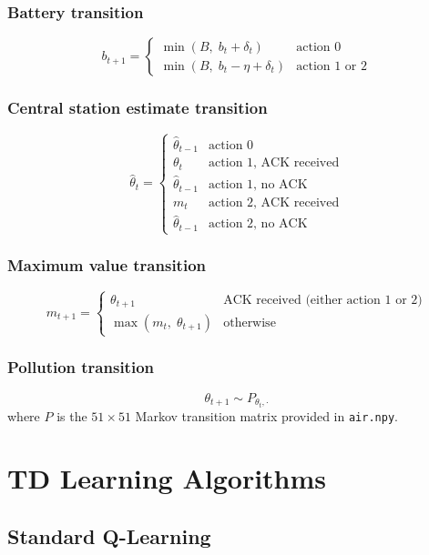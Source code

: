 \documentclass[12pt, a4paper]{article}
\begin{document}
\subsubsection*{Battery transition}
\[
b_{t+1} = \begin{cases}
\min(B,\; b_t + \delta_t) & \text{action 0} \\
\min(B,\; b_t - \eta + \delta_t) & \text{action 1 or 2}
\end{cases}
\]

\subsubsection*{Central station estimate transition}
\[
\hat{\theta}_t = \begin{cases}
\hat{\theta}_{t-1} & \text{action 0} \\
\theta_t & \text{action 1, ACK received} \\
\hat{\theta}_{t-1} & \text{action 1, no ACK} \\
m_t & \text{action 2, ACK received} \\
\hat{\theta}_{t-1} & \text{action 2, no ACK}
\end{cases}
\]

\subsubsection*{Maximum value transition}
\[
m_{t+1} = \begin{cases}
\theta_{t+1} & \text{ACK received (either action 1 or 2)} \\
\max(m_t,\; \theta_{t+1}) & \text{otherwise}
\end{cases}
\]

\subsubsection*{Pollution transition}
\[
\theta_{t+1} \sim P_{\theta_t, \cdot}
\]
where $P$ is the $51 \times 51$ Markov transition matrix provided in \texttt{air.npy}.

\newpage

\section{TD Learning Algorithms}

\subsection{Standard Q-Learning}
\end{document}
